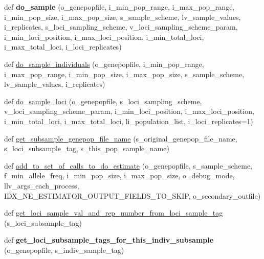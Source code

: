 \begin{DoxyCompactItemize}
\item 
def {\bfseries do\+\_\+sample} (o\+\_\+genepopfile, i\+\_\+min\+\_\+pop\+\_\+range, i\+\_\+max\+\_\+pop\+\_\+range, i\+\_\+min\+\_\+pop\+\_\+size, i\+\_\+max\+\_\+pop\+\_\+size, s\+\_\+sample\+\_\+scheme, lv\+\_\+sample\+\_\+values, i\+\_\+replicates, s\+\_\+loci\+\_\+sampling\+\_\+scheme, v\+\_\+loci\+\_\+sampling\+\_\+scheme\+\_\+param, i\+\_\+min\+\_\+loci\+\_\+position, i\+\_\+max\+\_\+loci\+\_\+position, i\+\_\+min\+\_\+total\+\_\+loci, i\+\_\+max\+\_\+total\+\_\+loci, i\+\_\+loci\+\_\+replicates)\hypertarget{namespacenegui_1_1pgdriveneestimator_a86525a538fa260271dfe37b1be91f722}{}\label{namespacenegui_1_1pgdriveneestimator_a86525a538fa260271dfe37b1be91f722}

\item 
def \hyperlink{namespacenegui_1_1pgdriveneestimator_a42358a2f09bb6b1382445f5adfa0f30b}{do\+\_\+sample\+\_\+individuals} (o\+\_\+genepopfile, i\+\_\+min\+\_\+pop\+\_\+range, i\+\_\+max\+\_\+pop\+\_\+range, i\+\_\+min\+\_\+pop\+\_\+size, i\+\_\+max\+\_\+pop\+\_\+size, s\+\_\+sample\+\_\+scheme, lv\+\_\+sample\+\_\+values, i\+\_\+replicates)
\item 
def \hyperlink{namespacenegui_1_1pgdriveneestimator_aa00978b309c19b845999c740f528081b}{do\+\_\+sample\+\_\+loci} (o\+\_\+genepopfile, s\+\_\+loci\+\_\+sampling\+\_\+scheme, v\+\_\+loci\+\_\+sampling\+\_\+scheme\+\_\+param, i\+\_\+min\+\_\+loci\+\_\+position, i\+\_\+max\+\_\+loci\+\_\+position, i\+\_\+min\+\_\+total\+\_\+loci, i\+\_\+max\+\_\+total\+\_\+loci, li\+\_\+population\+\_\+list, i\+\_\+loci\+\_\+replicates=1)
\item 
def \hyperlink{namespacenegui_1_1pgdriveneestimator_a9359fcbe384546efd152c8d06fec5aa5}{get\+\_\+subsample\+\_\+genepop\+\_\+file\+\_\+name} (s\+\_\+original\+\_\+genepop\+\_\+file\+\_\+name, s\+\_\+loci\+\_\+subsample\+\_\+tag, s\+\_\+this\+\_\+pop\+\_\+sample\+\_\+name)
\item 
def \hyperlink{namespacenegui_1_1pgdriveneestimator_aafa3e0bfbcd37225f2ba7049e6db0f1f}{add\+\_\+to\+\_\+set\+\_\+of\+\_\+calls\+\_\+to\+\_\+do\+\_\+estimate} (o\+\_\+genepopfile, s\+\_\+sample\+\_\+scheme, f\+\_\+min\+\_\+allele\+\_\+freq, i\+\_\+min\+\_\+pop\+\_\+size, i\+\_\+max\+\_\+pop\+\_\+size, o\+\_\+debug\+\_\+mode, llv\+\_\+args\+\_\+each\+\_\+process, I\+D\+X\+\_\+\+N\+E\+\_\+\+E\+S\+T\+I\+M\+A\+T\+O\+R\+\_\+\+O\+U\+T\+P\+U\+T\+\_\+\+F\+I\+E\+L\+D\+S\+\_\+\+T\+O\+\_\+\+S\+K\+IP, o\+\_\+secondary\+\_\+outfile)
\item 
def \hyperlink{namespacenegui_1_1pgdriveneestimator_abd853ec3bf6e5ad25f39ba0b41302f14}{get\+\_\+loci\+\_\+sample\+\_\+val\+\_\+and\+\_\+rep\+\_\+number\+\_\+from\+\_\+loci\+\_\+sample\+\_\+tag} (s\+\_\+loci\+\_\+subsample\+\_\+tag)
\item 
def {\bfseries get\+\_\+loci\+\_\+subsample\+\_\+tags\+\_\+for\+\_\+this\+\_\+indiv\+\_\+subsample} (o\+\_\+genepopfile, s\+\_\+indiv\+\_\+sample\+\_\+tag)\hypertarget{namespacenegui_1_1pgdriveneestimator_a74ebd5df460252ff739c66e2091895d4}{}\label{namespacenegui_1_1pgdriveneestimator_a74ebd5df460252ff739c66e2091895d4}


\end{DoxyCompactItemize}
